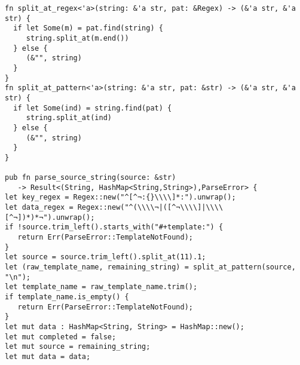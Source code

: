 \documentclass[11pt]{article}
\begin{document}
\begin{verbatim}
fn split_at_regex<'a>(string: &'a str, pat: &Regex) -> (&'a str, &'a str) {
  if let Some(m) = pat.find(string) {
     string.split_at(m.end())
  } else {
     (&"", string)
  }
}
fn split_at_pattern<'a>(string: &'a str, pat: &str) -> (&'a str, &'a str) {
  if let Some(ind) = string.find(pat) {
     string.split_at(ind)
  } else {
     (&"", string)
  }
}

pub fn parse_source_string(source: &str) 
   -> Result<(String, HashMap<String,String>),ParseError> {
let key_regex = Regex::new("^[^¬:{}\\\\]*:").unwrap();
let data_regex = Regex::new("^(\\\\¬|([^¬\\\\]|\\\\[^¬])*)*¬").unwrap();
if !source.trim_left().starts_with("#+template:") {
   return Err(ParseError::TemplateNotFound);
}
let source = source.trim_left().split_at(11).1;
let (raw_template_name, remaining_string) = split_at_pattern(source, "\n");
let template_name = raw_template_name.trim();
if template_name.is_empty() {
   return Err(ParseError::TemplateNotFound);
}
let mut data : HashMap<String, String> = HashMap::new();
let mut completed = false;
let mut source = remaining_string;
let mut data = data;


\end{verbatim}
\end{document}
